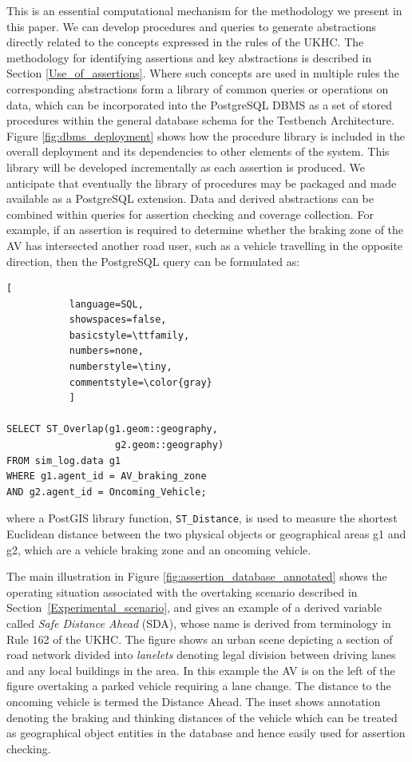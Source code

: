This is an essential computational mechanism for the methodology we present in this paper. We can develop procedures and queries to generate abstractions directly related to the concepts expressed in the rules of the UKHC. The methodology for identifying assertions and key abstractions is described in Section \ref{Use_of_assertions}. Where such concepts are used in multiple rules the corresponding abstractions form a library of common queries or operations on data, which can be incorporated into the PostgreSQL DBMS as a set of stored procedures within the general database schema for the Testbench Architecture.  Figure \ref{fig:dbms_deployment} shows how the procedure library is included in the overall deployment and its dependencies to other elements of the system. This library will be developed incrementally as each assertion is produced. We anticipate that eventually the library of procedures may be packaged and made available as a PostgreSQL extension. 
Data and derived abstractions can be combined within queries for assertion checking and coverage collection. For example, if an assertion is required to determine whether the braking zone of the AV has intersected another road user, such as a vehicle travelling in the opposite direction, then the PostgreSQL query can be formulated as:

\begin{lstlisting}[
           language=SQL,
           showspaces=false,
           basicstyle=\ttfamily,
           numbers=none,
           numberstyle=\tiny,
           commentstyle=\color{gray}
           ]
        
SELECT ST_Overlap(g1.geom::geography,
                   g2.geom::geography)
FROM sim_log.data g1
WHERE g1.agent_id = AV_braking_zone 
AND g2.agent_id = Oncoming_Vehicle;
\end{lstlisting} where a PostGIS library function,  \texttt{ST\_Distance}, is used to measure the shortest Euclidean distance between the two physical objects or geographical areas g1 and g2, which are a vehicle braking zone and an oncoming vehicle. 

The main illustration in Figure \ref{fig:assertion_database_annotated} shows the operating situation associated with the overtaking scenario described in Section~\ref{Experimental_scenario}, and gives an example of a derived variable called \emph{Safe Distance Ahead} (SDA), whose name is derived from terminology in Rule 162 of the UKHC. The figure shows an urban scene depicting a section of road network divided into \emph{lanelets} denoting legal division between driving lanes and any local buildings in the area. In this example the AV is on the left of the figure overtaking a parked vehicle requiring a lane change. The distance to the oncoming vehicle is termed the Distance Ahead. The inset shows annotation denoting the braking and thinking distances of the vehicle which can be treated as geographical object entities in the database and hence easily used for assertion checking. 

